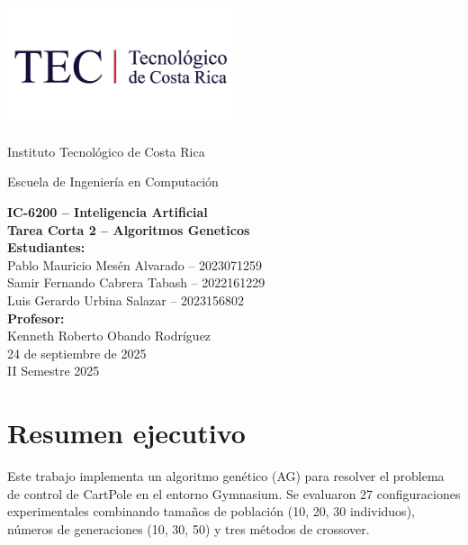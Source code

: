 \documentclass[12pt,a4paper]{article}
\begin{document}
\begin{titlepage}
    \centering
    \includegraphics[width=0.5\textwidth]{img/logo-tec.png}
    \vspace{1cm}

    {\LARGE Instituto Tecnológico de Costa Rica \par}
    \vspace{0.5cm}
    {\Large Escuela de Ingeniería en Computación \par}
    \vspace{0.5cm}

    {\LARGE \textbf{IC-6200 – Inteligencia Artificial}}\\[2cm]

    {\huge \textbf{Tarea Corta 2 – Algoritmos Geneticos}}\\[3cm]

    \textbf{Estudiantes:}\\[0.3cm]
    Pablo Mauricio Mesén Alvarado -- 2023071259\\
    Samir Fernando Cabrera Tabash -- 2022161229\\
    Luis Gerardo Urbina Salazar -- 2023156802\\[1.5cm]

    \textbf{Profesor:}\\[0.3cm]
    Kenneth Roberto Obando Rodríguez\\[1cm]

    24 de septiembre de 2025 \\[0.3cm]
    II Semestre 2025
    \vfill
\end{titlepage}

 \tableofcontents
 \newpage

\section{Resumen ejecutivo}

Este trabajo implementa un algoritmo genético (AG) para resolver el problema de control de CartPole en el entorno Gymnasium. Se evaluaron 27 configuraciones experimentales combinando tamaños de población (10, 20, 30 individuos), números de generaciones (10, 30, 50) y tres métodos de crossover.
\end{document}
